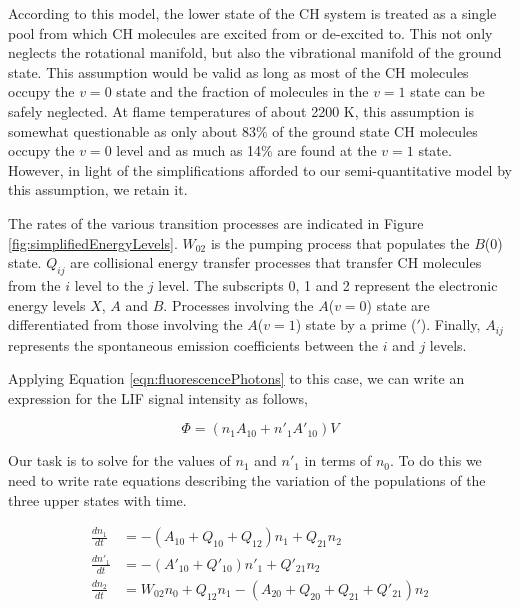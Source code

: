 

According to this model, the lower state of the CH system is treated as a single pool from which CH molecules are excited from or de-excited to.
This not only neglects the rotational manifold, but also the vibrational manifold of the ground state.
This assumption would be valid as long as most of the CH molecules occupy the \(v=0\) state and the fraction of molecules in the \(v=1\) state can be safely neglected.
At flame temperatures of about 2200 K, this assumption is somewhat questionable as only about 83\% of the ground state CH molecules occupy the \(v=0\) level and as much as 14\% are found at the \(v=1\) state.
However, in light of the simplifications afforded to our semi-quantitative model by this assumption, we retain it.

The rates of the various transition processes are indicated in Figure \ref{fig:simplifiedEnergyLevels}.
\(W_{02}\) is the pumping process that populates the \(B\)(0) state.
\(Q_{ij}\) are collisional energy transfer processes that transfer CH molecules from the \(i\) level to the \(j\) level.
The subscripts 0, 1 and 2 represent the electronic energy levels \(X\), \(A\) and \(B\).
Processes involving the \(A\)(\(v=0\)) state are differentiated from those involving the \(A\)(\(v=1\)) state by a prime (\('\)).
Finally, \(A_{ij}\) represents the spontaneous emission coefficients between the \(i\) and \(j\) levels.

Applying Equation \ref{eqn:fluorescencePhotons} to this case, we can write an expression for the LIF signal intensity as follows,

\begin{equation}
  \Phi = ( n_1 A_{10} + n'_1 A'_{10} )V
  \label{eqn:signalIntensity}
\end{equation}

Our task is to solve for the values of \(n_1\) and \(n'_1\) in terms of \(n_0\).
To do this we need to write rate equations describing the variation of the populations of the three upper states with time.

\begin{align}
  \frac{dn_1}{dt} &= -( A_{10} + Q_{10} + Q_{12} )n_1 + Q_{21} n_2
  \label{eqn:rates1}\\
  \frac{dn'_1}{dt} &= -( A'_{10} + Q'_{10} )n'_1 + Q'_{21} n_2
  \label{eqn:rates2}\\
  \frac{dn_2}{dt} &= W_{02} n_0 + Q_{12} n_1 - ( A_{20} + Q_{20} + Q_{21} + Q'_{21} )n_2
  \label{eqn:rates3}
\end{align}

